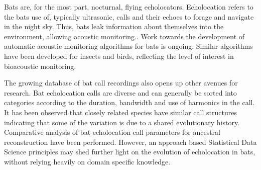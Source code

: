 \documentclass[wsdraft]{ws-rv9x6} %
\begin{document}
Bats are, for the most part, nocturnal, flying echolocators.\cite{kunz1994bats} Echolocation refers to the bats use of, typically ultrasonic\cite{corso1963bone}, calls and their echoes to forage and navigate in the night sky.\cite{griffin1944echolocation} Thus, bats leak information about themselves into the environment, allowing acoustic monitoring.\cite{pettorelli2013indicator}. Work towards the development of automatic acoustic monitoring algorithms for bats \cite{stathopoulos2017bat} \cite{walters2012continental} is ongoing. Similar algorithms have been developed for insects\cite{chesmore2004automated} and birds\cite{briggs2012acoustic}, reflecting the level of interest in bioacoustic monitoring.

The growing database of bat call recordings \cite{collen2012evolution} also opens up other avenues for research. Bat echolocation calls are diverse and can generally be sorted into categories according to the duration, bandwidth and use of harmonics in the call.\cite{maltby20104} It has been observed that closely related species have similar call structures indicating that some of the variation is due to a shared evolutionary history.\cite{jones2006evolution} Comparative analysis of bat echolocation call parameters for ancestral reconstruction\cite{joy2016ancestral} have been performed.\cite{collen2012evolution} However, an approach based Statistical Data Science principles may shed further light on the evolution of echolocation in bats, without relying heavily on domain specific knowledge.
\end{document}
